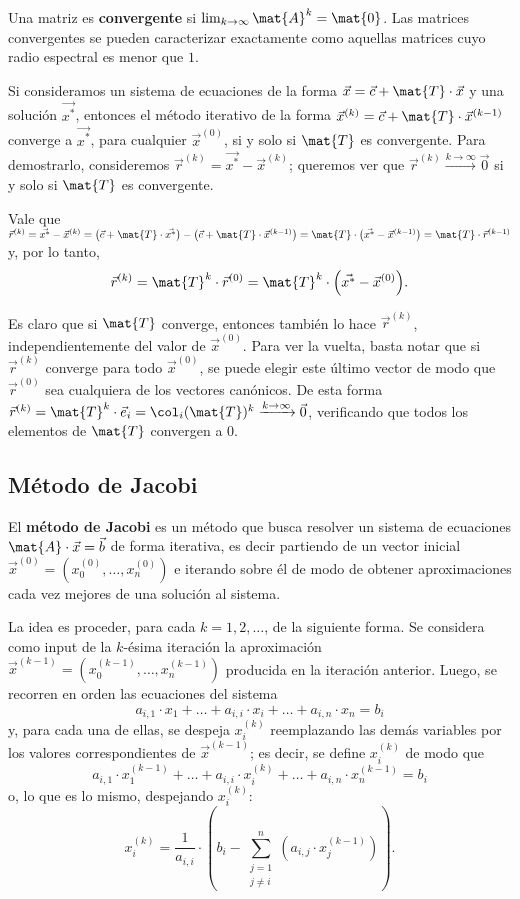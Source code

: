 Una matriz es \textbf{convergente} si $\lim_{k \to \infty} \mat{A}^k
= \mat{0}$. Las matrices convergentes se pueden caracterizar exactamente como
aquellas matrices cuyo radio espectral es menor que $1$.

Si consideramos un sistema de ecuaciones de la forma $\vec{x} = \vec{c} +
\mat{T} \cdot \vec{x}$ y una solución $\vec{x^\ast}$, entonces el método
iterativo de la forma $\vec{x}^{(k)} = \vec{c} + \mat{T} \cdot
\vec{x}^{(k-1)}$ converge a $\vec{x^\ast}$, para cualquier $\vec{x}^{(0)}$,
si y solo si $\mat{T}$ es convergente.
Para demostrarlo, consideremos $\vec{r}^{(k)} = \vec{x^\ast} - \vec{x}^{(k)}$;
queremos ver que $\vec{r}^{(k)} \xrightarrow{k\to\infty} \vec{0}$ si y solo
si $\mat{T}$ es convergente.

Vale que
$\vec{r}^{(k)}
    = \vec{x^\ast} - \vec{x}^{(k)}
    = \big( \vec{c} + \mat{T} \cdot \vec{x^\ast} \big)
        - \big( \vec{c} + \mat{T} \cdot \vec{x}^{(k-1)} \big)
    = \mat{T} \cdot \big( \vec{x^\ast} - \vec{x}^{(k-1)} \big)
    = \mat{T} \cdot \vec{r}^{(k-1)} $
y, por lo tanto,
\[ \vec{r}^{(k)} = \mat{T}^k \cdot \vec{r}^{(0)}
    = \mat{T}^k \cdot \Big( \vec{x^\ast} - \vec{x}^{(0)} \Big). \]

Es claro que si $\mat{T}$ converge, entonces también lo hace $\vec{r}^{(k)}$,
independientemente del valor de $\vec{x}^{(0)}$.
Para ver la vuelta, basta notar que si $\vec{r}^{(k)}$ converge para todo 
$\vec{x}^{(0)}$, se puede elegir este último vector de modo que
$\vec{r}^{(0)}$ sea cualquiera de los vectores canónicos. De esta forma
$\vec{r}^{(k)} = \mat{T}^k \cdot \vec{e}_i = \col_i(\mat{T})^k
\xrightarrow{k\to\infty} \vec{0}$, verificando que todos los elementos de
$\mat{T}$ convergen a 0.

\subsection{Método de Jacobi}
El \textbf{método de Jacobi} es un método que busca resolver un sistema de
ecuaciones $\mat{A} \cdot \vec{x} = \vec{b}$ de forma iterativa, es decir
partiendo de un vector inicial $\vec{x}^{(0)} = (x^{(0)}_0, \dots, x^{(0)}_n)$
e iterando sobre él de modo de obtener aproximaciones cada vez mejores de una
solución al sistema.

La idea es proceder, para cada $k = 1, 2, \dots$, de la siguiente forma.
Se considera como input de la $k$-ésima iteración la aproximación
$\vec{x}^{(k-1)} = (x^{(k-1)}_0, \dots, x^{(k-1)}_n)$ producida en la
iteración anterior. Luego, se recorren en orden las ecuaciones del sistema
\[ a_{i,1} \cdot x_1 + \dots + a_{i,i} \cdot x_i + \dots
    + a_{i,n} \cdot x_n = b_i \]
y, para cada una de ellas, se despeja $x^{(k)}_i$ reemplazando las demás
variables por los valores correspondientes de $\vec{x}^{(k-1)}$; es decir,
se define $x^{(k)}_i$ de modo que
\[ a_{i,1} \cdot x^{(k-1)}_1 + \dots + a_{i,i} \cdot x^{(k)}_i + \dots
    + a_{i,n} \cdot x^{(k-1)}_n = b_i \]
o, lo que es lo mismo, despejando $x^{(k)}_i$:
\[ x^{(k)}_i = \frac{1}{a_{i,i}} \cdot \left( b_i -
    \sum_{\substack{j=1 \\ j \neq i}}^{n} \left( a_{i,j}
    \cdot x^{(k-1)}_j \right) \right). \]


